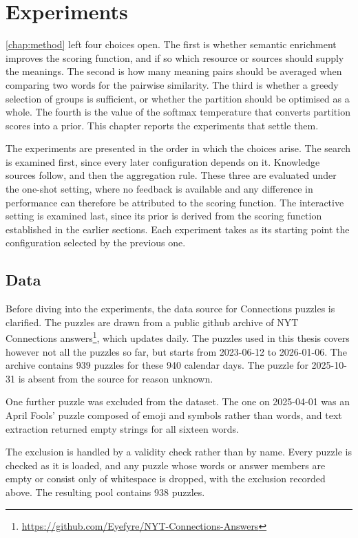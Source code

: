 \chapter{Experiments}
\label{chap:experiments}

\autoref{chap:method} left four choices open. The first is whether semantic enrichment improves the scoring function, and if so which resource or sources should supply the meanings. The second is how many meaning pairs should be averaged when comparing two words for the pairwise similarity. The third is whether a greedy selection of groups is sufficient, or whether the partition should be optimised as a whole. The fourth is the value of the softmax temperature that converts partition scores into a prior. This chapter reports the experiments that settle them.

The experiments are presented in the order in which the choices arise. The search is examined first, since every later configuration depends on it. Knowledge sources follow, and then the aggregation rule. These three are evaluated under the one-shot setting, where no feedback is available and any difference in performance can therefore be attributed to the scoring function. The interactive setting is examined last, since its prior is derived from the scoring function established in the earlier sections. Each experiment takes as its starting point the configuration selected by the previous one.

\section{Data}
\label{sec:data}
Before diving into the experiments, the data source for Connections puzzles is clarified. 
The puzzles are drawn from a public github archive of NYT Connections answers\footnote{\url{https://github.com/Eyefyre/NYT-Connections-Answers}}, which updates daily. The puzzles used in this thesis covers however not all the puzzles so far, but starts from 2023-06-12 to 2026-01-06. The archive contains 939 puzzles for these 940 calendar days. The puzzle for 2025-10-31 is absent from the source for reason unknown.

One further puzzle was excluded from the dataset. The one on 2025-04-01 was an April Fools' puzzle composed of emoji and symbols rather than words, and text extraction returned empty strings for all sixteen words. 

The exclusion is handled by a validity check rather than by name. Every puzzle is checked as it is loaded, and any puzzle whose words or answer members are empty or consist only of whitespace is dropped, with the exclusion recorded above. The resulting pool contains 938 puzzles.

